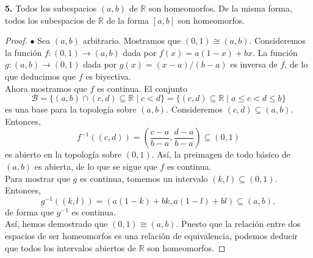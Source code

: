 \documentclass{article}
\begin{document}
\newpage

\begin{mybox}
	\textbf{5. } Todos los subespacios $(a, b)$  de $\mathbb{R}$ son homeomorfos. De la misma forma, todos los subespacios de $\mathbb{R}$ de la forma $[a, b]$ son homeomorfos.
\end{mybox}	
\begin{proof}
	$\bullet$ Sea $(a, b)$ arbitrario. Mostramos que $(0,1) \cong (a, b)$. Consideremos la función $f: (0, 1) \rightarrow (a, b)$ dada por $f(x) = a(1-x) + bx$. La función $g: (a, b) \rightarrow (0, 1)$ dada por $g(x) = (x- a)/ (b - a)$ es inversa de $f$, de lo que deducimos que $f$ es biyectiva. \\
	 Ahora mostramos que $f$ es continua. El conjunto 
	$$ \mathcal{B} = \{ (a, b) \cap (c, d) \subseteq \mathbb{R} \mid c < d \} = \{ (c, d) \subseteq \mathbb{R} \mid a \leq c < d \leq b \}$$
	es una base para la topología sobre $(a, b)$.  Consideremos $(c, d) \subseteq (a, b)$. Entonces, 
	$$ f^{-1}((c, d)) = \left( \frac{c - a}{b - a}, \frac{d -a}{b - a} \right) \subseteq (0, 1) $$
	es abierto en la topología sobre $(0, 1)$. Así, la preimagen de todo básico de $(a, b)$ es abierta, de lo que se sigue que $f$ es continua. \\
	Para mostrar que $g$ es continua, tomemos un intervalo $(k, l) \subseteq (0,1)$. Entonces,
	$$ g^{-1}((k, l )) = ( a(1- k) + bk, a(1- l) + bl ) \subseteq (a, b), $$
	de forma que $g^{-1}$ es continua. \\
	Así, hemos demostrado que $(0, 1) \cong (a, b)$. Puesto que la relación entre dos espacios de ser homeomorfos es una relación de equivalencia, podemos deducir que todos los intervalos abiertos de $\mathbb{R}$ son homeomorfos. 
\end{proof}
\end{document}

